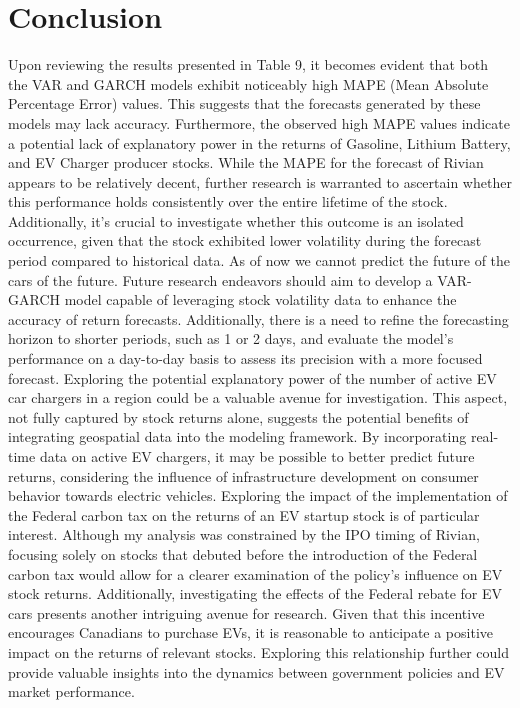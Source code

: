 \documentclass[a4paper,12pt]{article}
\begin{document}
\section{Conclusion}

Upon reviewing the results presented in Table 9, it becomes evident that both the VAR and GARCH models exhibit noticeably high MAPE (Mean Absolute Percentage Error) values. This suggests that the forecasts generated by these models may lack accuracy. Furthermore, the observed high MAPE values indicate a potential lack of explanatory power in the returns of Gasoline, Lithium Battery, and EV Charger producer stocks. While the MAPE for the forecast of Rivian appears to be relatively decent, further research is warranted to ascertain whether this performance holds consistently over the entire lifetime of the stock. Additionally, it's crucial to investigate whether this outcome is an isolated occurrence, given that the stock exhibited lower volatility during the forecast period compared to historical data. As of now we cannot predict the future of the cars of the future. Future research endeavors should aim to develop a VAR-GARCH model capable of leveraging stock volatility data to enhance the accuracy of return forecasts. Additionally, there is a need to refine the forecasting horizon to shorter periods, such as 1 or 2 days, and evaluate the model's performance on a day-to-day basis to assess its precision with a more focused forecast. Exploring the potential explanatory power of the number of active EV car chargers in a region could be a valuable avenue for investigation. This aspect, not fully captured by stock returns alone, suggests the potential benefits of integrating geospatial data into the modeling framework. By incorporating real-time data on active EV chargers, it may be possible to better predict future returns, considering the influence of infrastructure development on consumer behavior towards electric vehicles. Exploring the impact of the implementation of the Federal carbon tax on the returns of an EV startup stock is of particular interest. Although my analysis was constrained by the IPO timing of Rivian, focusing solely on stocks that debuted before the introduction of the Federal carbon tax would allow for a clearer examination of the policy's influence on EV stock returns. Additionally, investigating the effects of the Federal rebate for EV cars presents another intriguing avenue for research. Given that this incentive encourages Canadians to purchase EVs, it is reasonable to anticipate a positive impact on the returns of relevant stocks. Exploring this relationship further could provide valuable insights into the dynamics between government policies and EV market performance.\\
\end{document}
